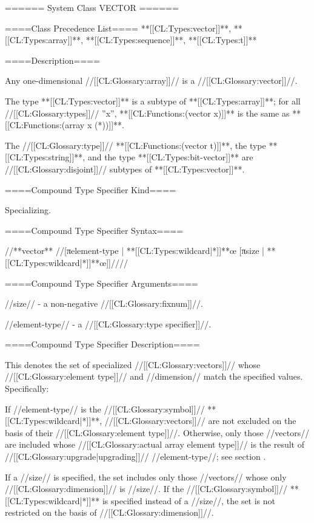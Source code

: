 ====== System Class VECTOR ======

====Class Precedence List====
**[[CL:Types:vector]]**, **[[CL:Types:array]]**, **[[CL:Types:sequence]]**, **[[CL:Types:t]]**

====Description====

Any one-dimensional //[[CL:Glossary:array]]// is a //[[CL:Glossary:vector]]//.

The type **[[CL:Types:vector]]** is a subtype of **[[CL:Types:array]]**; for all //[[CL:Glossary:types]]// ''x'', **[[CL:Functions:(vector x)]]** is the same as **[[CL:Functions:(array x (*))]]**.

The //[[CL:Glossary:type]]// **[[CL:Functions:(vector t)]]**, the type **[[CL:Types:string]]**, and the type **[[CL:Types:bit-vector]]** are //[[CL:Glossary:disjoint]]// subtypes of **[[CL:Types:vector]]**.

====Compound Type Specifier Kind====

Specializing.

====Compound Type Specifier Syntax====

//**vector** //[πelement-type | **[[CL:Types:wildcard|*]]**œ [πsize | **[[CL:Types:wildcard|*]]**œ]]////

====Compound Type Specifier Arguments====

//size// - a non-negative //[[CL:Glossary:fixnum]]//.

//element-type// - a //[[CL:Glossary:type specifier]]//.

====Compound Type Specifier Description====

This denotes the set of specialized //[[CL:Glossary:vectors]]// whose //[[CL:Glossary:element type]]// and //dimension// match the specified values. Specifically:

If //element-type// is the //[[CL:Glossary:symbol]]// **[[CL:Types:wildcard|*]]**, //[[CL:Glossary:vectors]]// are not excluded on the basis of their //[[CL:Glossary:element type]]//. Otherwise, only those //vectors// are included whose //[[CL:Glossary:actual array element type]]// is the result of //[[CL:Glossary:upgrade|upgrading]]// //element-type//; see section {\secref\ArrayUpgrading}.

If a //size// is specified, the set includes only those //vectors// whose only //[[CL:Glossary:dimension]]// is //size//. If the //[[CL:Glossary:symbol]]// **[[CL:Types:wildcard|*]]** is specified instead of a //size//, the set is not restricted on the basis of //[[CL:Glossary:dimension]]//.

